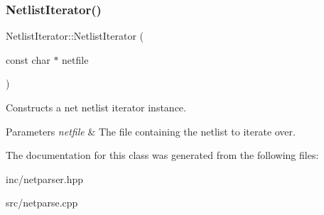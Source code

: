 \subsubsection{\texorpdfstring{Netlist\+Iterator()}{NetlistIterator()}}
{\footnotesize\ttfamily Netlist\+Iterator\+::\+Netlist\+Iterator (\begin{DoxyParamCaption}\item[{const char $\ast$}]{netfile }\end{DoxyParamCaption})}



Constructs a net netlist iterator instance. 


\begin{DoxyParams}{Parameters}
{\em netfile} & The file containing the netlist to iterate over. \\
\hline
\end{DoxyParams}


The documentation for this class was generated from the following files\+:\begin{DoxyCompactItemize}
\item 
inc/netparser.\+hpp\item 
src/netparse.\+cpp\end{DoxyCompactItemize}
